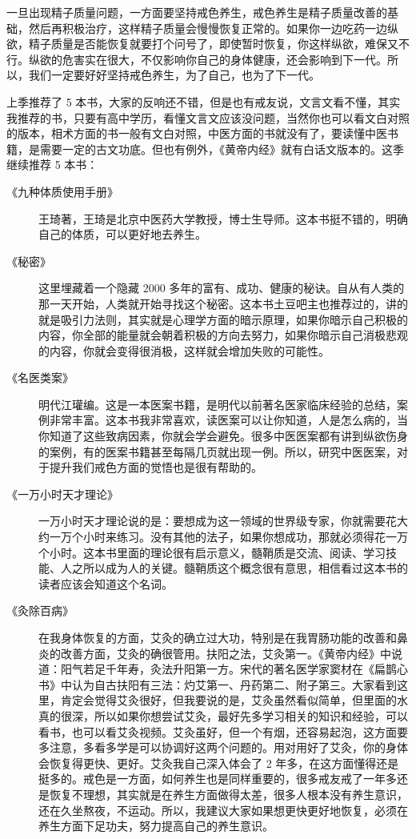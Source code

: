\documentclass{ctexart}
\begin{document}
一旦出现精子质量问题，一方面要坚持戒色养生，戒色养生是精子质量改善的基础，然后再积极治疗，这样精子质量会慢慢恢复正常的。如果你一边吃药一边纵欲，精子质量是否能恢复就要打个问号了，即使暂时恢复，你这样纵欲，难保又不行。纵欲的危害实在很大，不仅影响你自己的身体健康，还会影响到下一代。所以，我们一定要好好坚持戒色养生，为了自己，也为了下一代。

上季推荐了 5 本书，大家的反响还不错，但是也有戒友说，文言文看不懂，其实我推荐的书，只要有高中学历，看懂文言文应该没问题，当然你也可以看文白对照的版本，相术方面的书一般有文白对照，中医方面的书就没有了，要读懂中医书籍，是需要一定的古文功底。但也有例外，《黄帝内经》就有白话文版本的。这季继续推荐 5 本书：

\begin{description}
    \item[《九种体质使用手册》] 王琦著，王琦是北京中医药大学教授，博士生导师。这本书挺不错的，明确自己的体质，可以更好地去养生。
    \item[《秘密》] 这里埋藏着一个隐藏 2000 多年的富有、成功、健康的秘诀。自从有人类的那一天开始，人类就开始寻找这个秘密。这本书土豆吧主也推荐过的，讲的就是吸引力法则，其实就是心理学方面的暗示原理，如果你暗示自己积极的内容，你全部的能量就会朝着积极的方向去努力，如果你暗示自己消极悲观的内容，你就会变得很消极，这样就会增加失败的可能性。
    \item[《名医类案》] 明代江瓘编。这是一本医案书籍，是明代以前著名医家临床经验的总结，案例非常丰富。这本书我非常喜欢，读医案可以让你知道，人是怎么病的，当你知道了这些致病因素，你就会学会避免。很多中医医案都有讲到纵欲伤身的案例，有的医案书籍甚至每隔几页就出现一例。所以，研究中医医案，对于提升我们戒色方面的觉悟也是很有帮助的。
    \item[《一万小时天才理论》] 一万小时天才理论说的是：要想成为这一领域的世界级专家，你就需要花大约一万个小时来练习。没有其他的法子，如果你想成功，那就必须得花一万个小时。这本书里面的理论很有启示意义，髓鞘质是交流、阅读、学习技能、人之所以成为人的关键。髓鞘质这个概念很有意思，相信看过这本书的读者应该会知道这个名词。
    \item[《灸除百病》] 在我身体恢复的方面，艾灸的确立过大功，特别是在我胃肠功能的改善和鼻炎的改善方面，艾灸的确很管用。扶阳之法，艾灸第一。《黄帝内经》中说道：阳气若足千年寿，灸法升阳第一方。宋代的著名医学家窦材在《扁鹊心书》中认为自古扶阳有三法：灼艾第一、丹药第二、附子第三。大家看到这里，肯定会觉得艾灸很好，但我要说的是，艾灸虽然看似简单，但里面的水真的很深，所以如果你想尝试艾灸，最好先多学习相关的知识和经验，可以看书，也可以看艾灸视频。艾灸虽好，但一个有烟，还容易起泡，这方面要多注意，多看多学是可以协调好这两个问题的。用对用好了艾灸，你的身体会恢复得更快、更好。艾灸我自己深入体会了 2 年多，在这方面懂得还是挺多的。戒色是一方面，如何养生也是同样重要的，很多戒友戒了一年多还是恢复不理想，其实就是在养生方面做得太差，很多人根本没有养生意识，还在久坐熬夜，不运动。所以，我建议大家如果想更快更好地恢复，必须在养生方面下足功夫，努力提高自己的养生意识。
\end{description}
\end{document}
